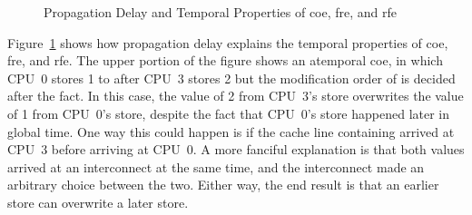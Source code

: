 \documentclass[10]{article}
\begin{document}
\begin{figure}[tb]
\begin{center}
\caption{Propagation Delay and Temporal Properties of coe, fre, and rfe}
\label{fig:Propagation Delay and Temporal Properties of coe, fre, and rfe}
\end{center}
\end{figure}

Figure~\ref{fig:Propagation Delay and Temporal Properties of coe, fre, and rfe}
shows how propagation delay explains the temporal properties of coe,
fre, and rfe.
The upper portion of the figure shows an atemporal coe, in which
CPU~0 stores 1 to  after CPU~3 stores 2 but
the modification order of  is decided after the fact.
In this case, the value of 2 from CPU~3's store overwrites the value
of 1 from CPU~0's store, despite the fact that CPU~0's store
happened later in global time.
One way this could happen is if the cache line containing
 arrived at CPU~3 before arriving at CPU~0.
A more fanciful explanation is that both values arrived at an
interconnect at the same time, and the interconnect made an
arbitrary choice between the two.
Either way, the end result is that an earlier store can overwrite
a later store.
\end{document}
